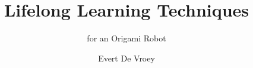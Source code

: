 \documentclass[noroman, 11pt]{tudelft-report}
\title{Lifelong Learning Techniques}
\subtitle{for an Origami Robot}
\author{Evert De Vroey}
\begin{document}
    \frontmatter



    

    

    \tableofcontents

    \mainmatter

    

    

    

    

    

    

    \appendix

    \newpage
    \listofchanges

%

    \printbibliography
\end{document}

